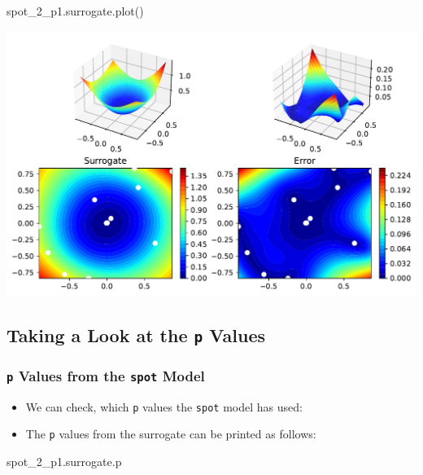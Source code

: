\documentclass[
  letterpaper,
  DIV=11,
  numbers=noendperiod]{scrreprt}
\newenvironment{Shaded}{\begin{snugshade}}{\end{snugshade}}
\newcommand{\NormalTok}[1]{\textcolor[rgb]{0.00,0.23,0.31}{#1}}
\providecommand{\tightlist}{%
  \setlength{\itemsep}{0pt}\setlength{\parskip}{0pt}}\usepackage{longtable,booktabs,array}
\begin{document}
\begin{Shaded}
\begin{Highlighting}[]
\NormalTok{spot\_2\_p1.surrogate.plot()}
\end{Highlighting}
\end{Shaded}

\includegraphics{015_num_spot_correlation_p_files/figure-pdf/cell-12-output-1.pdf}

\subsection{\texorpdfstring{Taking a Look at the \texttt{p}
Values}{Taking a Look at the p Values}}\label{taking-a-look-at-the-p-values}

\subsubsection{\texorpdfstring{\texttt{p} Values from the \texttt{spot}
Model}{p Values from the spot Model}}\label{p-values-from-the-spot-model}

\begin{itemize}
\tightlist
\item
  We can check, which \texttt{p} values the \texttt{spot} model has
  used:
\item
  The \texttt{p} values from the surrogate can be printed as follows:
\end{itemize}

\begin{Shaded}
\begin{Highlighting}[]
\NormalTok{spot\_2\_p1.surrogate.p}
\end{Highlighting}
\end{Shaded}
\end{document}

